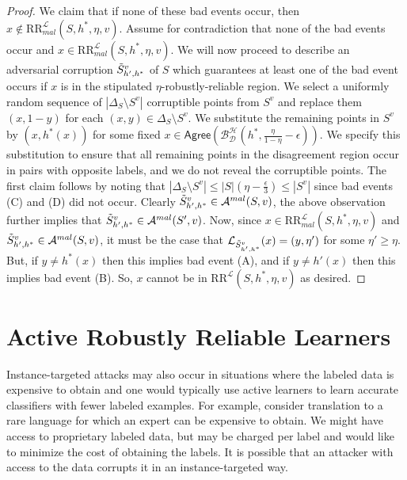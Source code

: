 \documentclass[11pt]{article}
\newcommand{\CR}{\text{RR}}
\newcommand{\0}{\mathbf{0}}
\newcommand{\1}{\mathbf{1}}
\newcommand{\cA}{\mathcal{A}}
\newcommand{\cB}{\mathcal{B}}
\newcommand{\cD}{\mathcal{D}}
\newcommand{\cH}{\mathcal{H}}
\newcommand{\cL}{\mathcal{L}}
\newcommand{\Agree}{\mathsf{Agree}}
\begin{document}
\begin{proof}
We claim that if none of these bad events occur, then $x \not\in \CR^\cL_{mal}(S,h^*,\eta,v)$.
Assume for contradiction that none of the bad events occur and $x \in \CR^\cL_{mal}(S,h^*,\eta,v)$. We will now proceed to describe an adversarial corruption $\Tilde{S}^{v}_{h',h^*}$ of $S$ which guarantees at least one of the bad event occurs if $x$ is in the stipulated $\eta$-robustly-reliable region. We select a uniformly random sequence of $|\Delta_S\setminus S^v|$ corruptible points from $S^v$ and replace them $(x,1-y)$ for each $(x,y)\in \Delta_S\setminus S^v$. We substitute the remaining points in $S^v$ by $(x,h^*(x))$ for some fixed $x\in \Agree(\cB_{\cD}^\cH(h^*,\frac{\eta}{1-\eta}-\epsilon))$.
We specify this substitution to ensure that all remaining points in the disagreement region occur in pairs with opposite labels, and we do not reveal the corruptible points. The first claim follows by noting that $|\Delta_S\setminus S^v|\le|S|(\eta - \frac{\epsilon}{3})\le|S^v|$ since bad events (C) and (D) did not occur. Clearly $\Tilde{S}^{v}_{h',h^*} \in \cA^{mal}(S,v)$, the above observation further implies that $\Tilde{S}^{v}_{h',h^*} \in \cA^{mal}(S',v)$. Now, since $x \in \CR^\cL_{mal}(S,h^*,\eta,v)$ and $\Tilde{S}^{v}_{h',h^*} \in \cA^{mal}(S,v)$, it must be the case that $\cL_{\Tilde{S}^{v}_{h',h^*}}(x) = (y,\eta')$ for some $\eta'\geq \eta$. But, if $y \neq h^*(x)$ then this implies bad event (A), and if $y \neq h'(x)$ then this implies bad event (B).  So, $x$ cannot be in $\CR^\cL(S,h^*,\eta,v)$ as desired.
\end{proof}

\section{Active Robustly Reliable Learners}

Instance-targeted attacks may also occur in situations where the labeled data is expensive to obtain and one would typically use active learners to learn accurate classifiers with fewer labeled examples. For example, consider translation to a rare language for which an expert can be expensive to obtain. We might have access to proprietary labeled data, but may be charged per label and would like to minimize the cost of obtaining the labels. It is possible that an attacker with access to the data corrupts it in an instance-targeted way.
\end{document}
